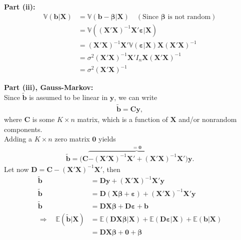 \documentclass[
]{book}
\begin{document}
\textbf{Part (ii):}
\begin{align*}
\mathbb{V}(\mathbf{b}|\mathbf{X})
  &=\mathbb{V}(\mathbf{b}-\boldsymbol{\beta}|\mathbf{X})\quad\left(\text{Since $\boldsymbol{\beta}$ is not random}\right)\\
  &=\mathbb{V}\left(\left(\mathbf{X}'\mathbf{X}\right)^{-1}\mathbf{X}'\boldsymbol{\varepsilon}|\mathbf{X}\right)\\
  &=\left(\mathbf{X}'\mathbf{X}\right)^{-1}\mathbf{X}'\mathbb{V}\left(\boldsymbol{\varepsilon}|\mathbf{X}\right)\mathbf{X}\left(\mathbf{X}'\mathbf{X}\right)^{-1}\\
  &=\sigma^2\left(\mathbf{X}'\mathbf{X}\right)^{-1}\mathbf{X}'I_n\mathbf{X}\left(\mathbf{X}'\mathbf{X}\right)^{-1}\\
  &=\sigma^2\left(\mathbf{X}'\mathbf{X}\right)^{-1}
\end{align*}

\textbf{Part (iii), Gauss-Markov:}\\
Since \(\tilde{\mathbf{b}}\) is assumed to be linear in \(\mathbf{y}\), we can
write
\begin{align*}
\tilde{\mathbf{b}}=\mathbf{C}\mathbf{y},
\end{align*}
where \(\mathbf{C}\) is
some \(K\times n\) matrix, which is a function of \(\mathbf{X}\) and/or nonrandom
components.\\
Adding a \(K\times n\) zero matrix \(\mathbf{0}\) yields
\begin{align*}
\tilde{\mathbf{b}}=\Big(\mathbf{C}\overbrace{-\left(\mathbf{X}'\mathbf{X}\right)^{-1}\mathbf{X}'+\left(\mathbf{X}'\mathbf{X}\right)^{-1}\mathbf{X}'}^{=\mathbf{0}}\Big)\mathbf{y}.
\end{align*}
Let now \(\mathbf{D}=\mathbf{C}-\left(\mathbf{X}'\mathbf{X}\right)^{-1}\mathbf{X}'\), then
\begin{align}
\tilde{\mathbf{b}}&=\mathbf{D}\mathbf{y} + \left(\mathbf{X}'\mathbf{X}\right)^{-1}\mathbf{X}'\mathbf{y}\nonumber\\
\tilde{\mathbf{b}}&=\mathbf{D}\left(\mathbf{X}\boldsymbol{\beta}+\boldsymbol{\varepsilon}\right) + \left(\mathbf{X}'\mathbf{X}\right)^{-1}\mathbf{X}'\mathbf{y}\nonumber\\
\tilde{\mathbf{b}}&=\mathbf{D}\mathbf{X}\boldsymbol{\beta}+\mathbf{D}\boldsymbol{\varepsilon} + \mathbf{b}
\label{eq:c3e16}\\[2ex]
\Rightarrow\quad\mathbb{E}(\tilde{\mathbf{b}}|\mathbf{X})&=\mathbb{E}(\mathbf{D}\mathbf{X}\boldsymbol{\beta}|\mathbf{X})+\mathbb{E}(\mathbf{D}\boldsymbol{\varepsilon}|\mathbf{X})+\mathbb{E}(\mathbf{b}|\mathbf{X})\nonumber\\
&=\mathbf{D}\mathbf{X}\boldsymbol{\beta}+\mathbf{0}+\boldsymbol{\beta}
\label{eq:c3e17}
\end{align}
\end{document}
